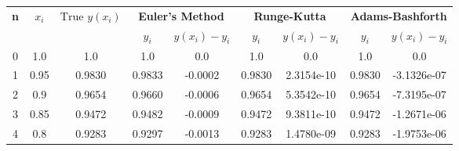 \documentclass[conference,onecolumn]{IEEEtran}
\begin{document}
\begin{enumerate}
            \begin{table}[H]
                  \centering
                  \begin{tabular}{c c c | c c | c c | c c}
                        \toprule
                        \multirow{2}{*}{\textbf{n}} & \multirow{2}{*}{$x_i$} & \multirow{2}{*}{$\text{True } y(x_i)$} & \multicolumn{2}{c|}{\textbf{Euler's Method}} & \multicolumn{2}{c|}{\textbf{Runge-Kutta}} & \multicolumn{2}{c}{\textbf{Adams-Bashforth}}                                            \\
                        \cmidrule{4-9}
                                                    &                        &                                        & $y_i$                                        & $y(x_i) - y_i$                            & $y_i$                                        & $y(x_i) - y_i$ & $y_i$  & $y(x_i) - y_i$ \\
                        \midrule
                        0                           & 1.0                    & 1.0                                    & 1.0                                          & 0.0                                       & 1.0                                          & 0.0            & 1.0    & 0.0            \\
                        1                           & 0.95                   & 0.9830                                 & 0.9833                                       & -0.0002                                   & 0.9830                                       & 2.3154e-10     & 0.9830 & -3.1326e-07    \\
                        2                           & 0.9                    & 0.9654                                 & 0.9660                                       & -0.0006                                   & 0.9654                                       & 5.3542e-10     & 0.9654 & -7.3195e-07    \\
                        3                           & 0.85                   & 0.9472                                 & 0.9482                                       & -0.0009                                   & 0.9472                                       & 9.3811e-10     & 0.9472 & -1.2671e-06    \\
                        4                           & 0.8                    & 0.9283                                 & 0.9297                                       & -0.0013                                   & 0.9283                                       & 1.4780e-09     & 0.9283 & -1.9753e-06    \\

\end{tabular}
\end{table}
\end{enumerate}
\end{document}
